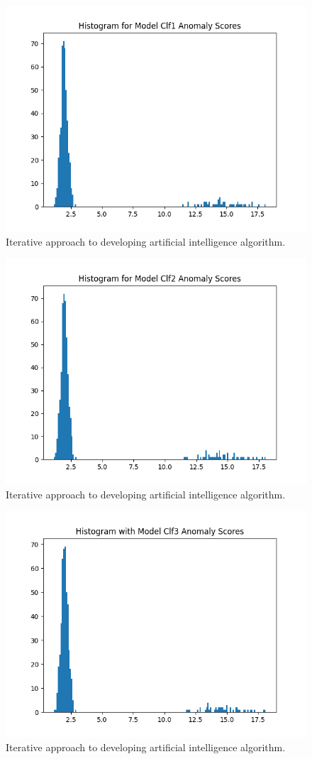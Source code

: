 \documentclass[]{scrartcl}
\begin{document}
\begin{figure}
	\centering
	\includegraphics[width=0.7\linewidth]{Figure_2}
	\caption[Anomaly Detection Histogram]{Iterative approach to developing artificial intelligence algorithm.}
	\label{fig:figure2}
\end{figure}

\begin{figure}
	\centering
	\includegraphics[width=0.7\linewidth]{Figure_3}
	\caption[Anomaly Detection Histogram]{Iterative approach to developing artificial intelligence algorithm.}
	\label{fig:figure3}
\end{figure}

\begin{figure}
	\centering
	\includegraphics[width=0.7\linewidth]{Figure_4}
	\caption[Anomaly Detection Histogram]{Iterative approach to developing artificial intelligence algorithm.}
	\label{fig:figure4}
\end{figure}
\end{document}
